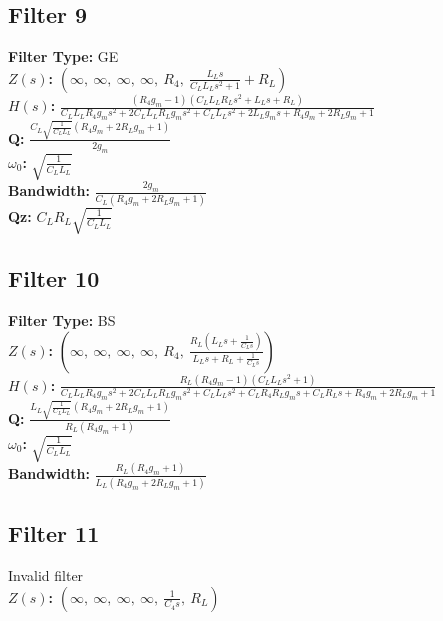 \documentclass{article}
\begin{document}
\subsection*{Filter 9}
\textbf{Filter Type:} GE \\ 
\textbf{$Z(s)$:} $\left( \infty, \  \infty, \  \infty, \  \infty, \  R_{4}, \  \frac{L_{L} s}{C_{L} L_{L} s^{2} + 1} + R_{L}\right)$ \\ 
\textbf{$H(s)$:} $\frac{\left(R_{4} g_{m} - 1\right) \left(C_{L} L_{L} R_{L} s^{2} + L_{L} s + R_{L}\right)}{C_{L} L_{L} R_{4} g_{m} s^{2} + 2 C_{L} L_{L} R_{L} g_{m} s^{2} + C_{L} L_{L} s^{2} + 2 L_{L} g_{m} s + R_{4} g_{m} + 2 R_{L} g_{m} + 1}$ \\ 
\textbf{Q:} $\frac{C_{L} \sqrt{\frac{1}{C_{L} L_{L}}} \left(R_{4} g_{m} + 2 R_{L} g_{m} + 1\right)}{2 g_{m}}$ \\ 
\textbf{$\omega_0$:} $\sqrt{\frac{1}{C_{L} L_{L}}}$ \\ 
\textbf{Bandwidth:} $\frac{2 g_{m}}{C_{L} \left(R_{4} g_{m} + 2 R_{L} g_{m} + 1\right)}$ \\ 
\textbf{Qz:} $C_{L} R_{L} \sqrt{\frac{1}{C_{L} L_{L}}}$ \\ 
\subsection*{Filter 10}
\textbf{Filter Type:} BS \\ 
\textbf{$Z(s)$:} $\left( \infty, \  \infty, \  \infty, \  \infty, \  R_{4}, \  \frac{R_{L} \left(L_{L} s + \frac{1}{C_{L} s}\right)}{L_{L} s + R_{L} + \frac{1}{C_{L} s}}\right)$ \\ 
\textbf{$H(s)$:} $\frac{R_{L} \left(R_{4} g_{m} - 1\right) \left(C_{L} L_{L} s^{2} + 1\right)}{C_{L} L_{L} R_{4} g_{m} s^{2} + 2 C_{L} L_{L} R_{L} g_{m} s^{2} + C_{L} L_{L} s^{2} + C_{L} R_{4} R_{L} g_{m} s + C_{L} R_{L} s + R_{4} g_{m} + 2 R_{L} g_{m} + 1}$ \\ 
\textbf{Q:} $\frac{L_{L} \sqrt{\frac{1}{C_{L} L_{L}}} \left(R_{4} g_{m} + 2 R_{L} g_{m} + 1\right)}{R_{L} \left(R_{4} g_{m} + 1\right)}$ \\ 
\textbf{$\omega_0$:} $\sqrt{\frac{1}{C_{L} L_{L}}}$ \\ 
\textbf{Bandwidth:} $\frac{R_{L} \left(R_{4} g_{m} + 1\right)}{L_{L} \left(R_{4} g_{m} + 2 R_{L} g_{m} + 1\right)}$ \\ 
\subsection*{Filter 11}
Invalid filter \\ 
\textbf{$Z(s)$:} $\left( \infty, \  \infty, \  \infty, \  \infty, \  \frac{1}{C_{4} s}, \  R_{L}\right)$ \\ 
\end{document}

